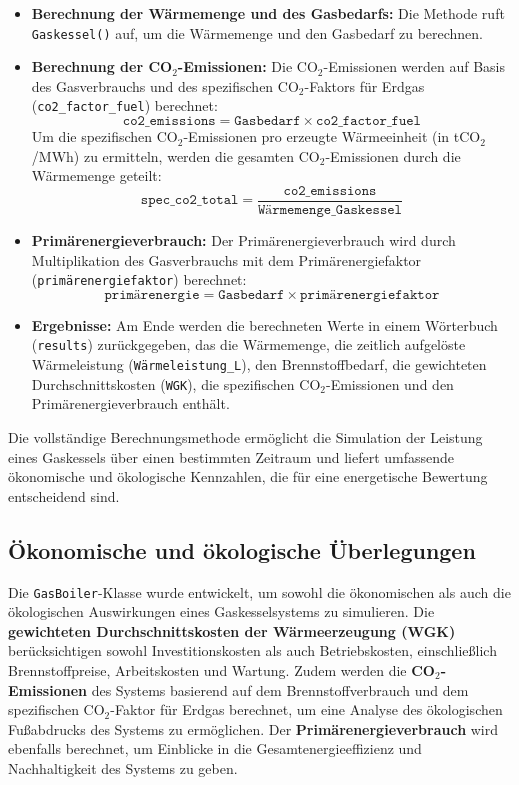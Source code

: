 \begin{itemize}
    \item \textbf{Berechnung der Wärmemenge und des Gasbedarfs:} Die Methode ruft \texttt{Gaskessel()} auf, um die Wärmemenge und den Gasbedarf zu berechnen.
    
    \item \textbf{Berechnung der CO$_2$-Emissionen:} Die CO$_2$-Emissionen werden auf Basis des Gasverbrauchs und des spezifischen CO$_2$-Faktors für Erdgas (\texttt{co2\_factor\_fuel}) berechnet:
    \[
    \texttt{co2\_emissions} = \texttt{Gasbedarf} \times \texttt{co2\_factor\_fuel}
    \]
    Um die spezifischen CO$_2$-Emissionen pro erzeugte Wärmeeinheit (in tCO$_2$/MWh) zu ermitteln, werden die gesamten CO$_2$-Emissionen durch die Wärmemenge geteilt:
    \[
    \texttt{spec\_co2\_total} = \frac{\texttt{co2\_emissions}}{\texttt{Wärmemenge\_Gaskessel}}
    \]
    
    \item \textbf{Primärenergieverbrauch:} Der Primärenergieverbrauch wird durch Multiplikation des Gasverbrauchs mit dem Primärenergiefaktor (\texttt{primärenergiefaktor}) berechnet:
    \[
    \texttt{primärenergie} = \texttt{Gasbedarf} \times \texttt{primärenergiefaktor}
    \]
    
    \item \textbf{Ergebnisse:} Am Ende werden die berechneten Werte in einem Wörterbuch (\texttt{results}) zurückgegeben, das die Wärmemenge, die zeitlich aufgelöste Wärmeleistung (\texttt{Wärmeleistung\_L}), den Brennstoffbedarf, die gewichteten Durchschnittskosten (\texttt{WGK}), die spezifischen CO$_2$-Emissionen und den Primärenergieverbrauch enthält.
\end{itemize}

Die vollständige Berechnungsmethode ermöglicht die Simulation der Leistung eines Gaskessels über einen bestimmten Zeitraum und liefert umfassende ökonomische und ökologische Kennzahlen, die für eine energetische Bewertung entscheidend sind.

\subsection{Ökonomische und ökologische Überlegungen}
Die \texttt{GasBoiler}-Klasse wurde entwickelt, um sowohl die ökonomischen als auch die ökologischen Auswirkungen eines Gaskesselsystems zu simulieren. Die \textbf{gewichteten Durchschnittskosten der Wärmeerzeugung (WGK)} berücksichtigen sowohl Investitionskosten als auch Betriebskosten, einschließlich Brennstoffpreise, Arbeitskosten und Wartung. Zudem werden die \textbf{CO$_2$-Emissionen} des Systems basierend auf dem Brennstoffverbrauch und dem spezifischen CO$_2$-Faktor für Erdgas berechnet, um eine Analyse des ökologischen Fußabdrucks des Systems zu ermöglichen. Der \textbf{Primärenergieverbrauch} wird ebenfalls berechnet, um Einblicke in die Gesamtenergieeffizienz und Nachhaltigkeit des Systems zu geben.

